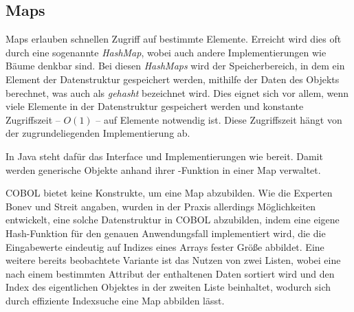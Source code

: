 \subsection{Maps}
Maps erlauben schnellen Zugriff auf bestimmte Elemente. Erreicht wird dies oft durch eine sogenannte \textit{HashMap}, wobei auch andere Implementierungen wie Bäume denkbar sind. Bei diesen \textit{HashMaps} wird der Speicherbereich, in dem ein Element der Datenstruktur gespeichert werden, mithilfe der Daten des Objekts berechnet, was auch als \textit{gehasht} bezeichnet wird. Dies eignet sich vor allem, wenn viele Elemente in der Datenstruktur gespeichert werden und konstante Zugriffszeit -- $O(1)$ -- auf Elemente notwendig ist. Diese Zugriffszeit hängt von der zugrundeliegenden Implementierung ab.

In Java steht dafür das Interface  und Implementierungen wie  bereit. Damit werden generische Objekte anhand ihrer -Funktion in einer Map verwaltet. 

COBOL bietet keine Konstrukte, um eine Map abzubilden. Wie die Experten Bonev und Streit angaben, wurden in der Praxis allerdings Möglichkeiten entwickelt, eine solche Datenstruktur in COBOL abzubilden, indem \zB eine eigene Hash-Funktion für den genauen Anwendungsfall implementiert wird, die die Eingabewerte eindeutig auf Indizes eines Arrays fester Größe abbildet. Eine weitere bereits beobachtete Variante ist das Nutzen von zwei Listen, wobei eine nach einem bestimmten Attribut der enthaltenen Daten sortiert wird und den Index des eigentlichen Objektes in der zweiten Liste beinhaltet, wodurch sich durch effiziente Indexsuche eine Map abbilden lässt.